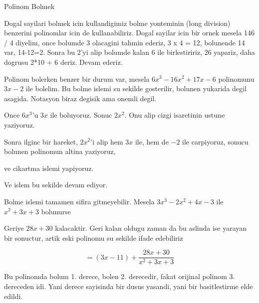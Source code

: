 \documentclass[12pt,fleqn]{article}\usepackage{../common}
\begin{document}
Polinom Bolmek 

Dogal sayilari bolmek icin kullandigimiz bolme yonteminin (long division)
benzerini polinomlar icin de kullanabiliriz. Dogal sayilar icin bir ornek
mesela 146 / 4 diyelim, once bolumde 3 olacagini tahmin ederiz, 3 x 4 = 12,
bolunende 14 var, 14-12=2. Sonra bu 2'yi alip bolumde kalan 6 ile
birlestiririz, 26 yapariz, daha dogrusu 2*10 + 6 deriz. Devam ederiz. 

Polinom bolerken benzer bir durum var, mesela $6x^3-16x^2+17x-6$ polinomunu
$3x-2$ ile bolelim. Bu bolme islemi su sekilde gosterilir, bolunen yukarida
degil asagida. Notasyon biraz degisik ama onemli degil. 


Once $6x^3$'u $3x$ ile boluyoruz. Sonuc $2x^2$. Onu alip cizgi isaretinin
ustune yaziyoruz. 


Sonra ilginc bir hareket, $2x^2$'i alip hem $3x$ ile, hem de $-2$ ile
carpiyoruz, sonucu bolunen polinomun altina yaziyoruz, 


ve cikartma islemi yapiyoruz.


Ve islem bu sekilde devam ediyor. 


Bolme islemi tamamen sifira gitmeyebilir. Mesela $3x^3 - 2x^2 + 4x  - 3$
ile $x^2+3x+3$ bolunurse


Geriye $28x+30$ kalacaktir. Geri kalan oldugu zaman da bu aslinda ise
yarayan bir sonuctur, artik eski polinomu su sekilde ifade edebiliriz

\[=  (3x-11) + \frac{28x+30}{x^2+3x+3} \]

Bu polinomda bolum 1. derece, bolen 2. derecedir, fakat orijinal polinom
3. dereceden idi. Yani derece sayisinda bir dusus yasandi, yani bir
basitlestirme elde edildi. 
\end{document}
